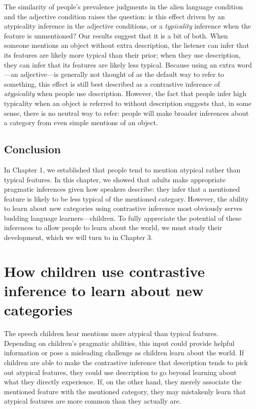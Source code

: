 \documentclass{ucetd}
\begin{document}
The similarity of people's prevalence judgments in the alien language
condition and the adjective condition raises the question: is this
effect driven by an atypicality inference in the adjective conditions,
or a \emph{typicality} inference when the feature is unmentioned? Our
results suggest that it is a bit of both. When someone mentions an
object without extra description, the listener can infer that its
features are likely more typical than their prior; when they use
description, they can infer that its features are likely less typical.
Because using an extra word---an adjective---is generally not thought of
as the default way to refer to something, this effect is still best
described as a contrastive inference of \emph{atypicality} when people
use description. However, the fact that people infer high typicality
when an object is referred to without description suggests that, in some
sense, there is no neutral way to refer: people will make broader
inferences about a category from even simple mentions of an object.

\hypertarget{conclusion}{%
\section{Conclusion}\label{conclusion}}

In Chapter 1, we established that people tend to mention atypical rather
than typical features. In this chapter, we showed that adults make
appropriate pragmatic inferences given how speakers describe: they infer
that a mentioned feature is likely to be less typical of the mentioned
category. However, the ability to learn about new categories using
contrastive inference most obviously serves budding language
learners---children. To fully appreciate the potential of these
inferences to allow people to learn about the world, we must study their
development, which we will turn to in Chapter 3.

\hypertarget{how-children-use-contrastive-inference-to-learn-about-new-categories}{%
\chapter{How children use contrastive inference to learn about new
categories}\label{how-children-use-contrastive-inference-to-learn-about-new-categories}}

The speech children hear mentions more atypical than typical features.
Depending on children's pragmatic abilities, this input could provide
helpful information or pose a misleading challenge as children learn
about the world. If children are able to make the contrastive inference
that description tends to pick out atypical features, they could use
description to go beyond learning about what they directly experience.
If, on the other hand, they merely associate the mentioned feature with
the mentioned category, they may mistakenly learn that atypical features
are more common than they actually are.
\end{document}
